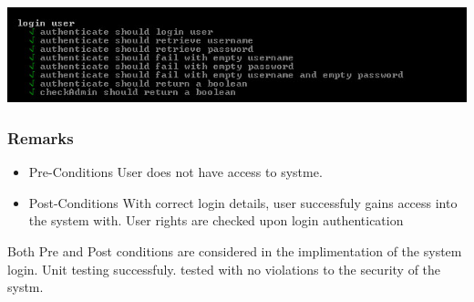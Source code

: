  \includegraphics[width=\linewidth]{./Graphics/userResults.jpg}
 
 \subsubsection{Remarks}
 	\begin{itemize}
 				\item Pre-Conditions
 		User does not have access to systme.
 				\item Post-Conditions
 With correct login details, user successfuly gains access into the system with.
 User rights are checked upon login authentication
  \end{itemize}
  
  Both Pre and Post conditions  are considered in the implimentation of the system login. Unit testing successfuly.  tested with no violations to the security of the systm.
 